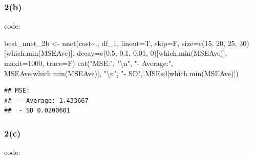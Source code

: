 \documentclass[
]{article}
\newenvironment{Shaded}{\begin{snugshade}}{\end{snugshade}}
\newcommand{\AttributeTok}[1]{\textcolor[rgb]{0.77,0.63,0.00}{#1}}
\newcommand{\DecValTok}[1]{\textcolor[rgb]{0.00,0.00,0.81}{#1}}
\newcommand{\FloatTok}[1]{\textcolor[rgb]{0.00,0.00,0.81}{#1}}
\newcommand{\FunctionTok}[1]{\textcolor[rgb]{0.00,0.00,0.00}{#1}}
\newcommand{\NormalTok}[1]{#1}
\newcommand{\OtherTok}[1]{\textcolor[rgb]{0.56,0.35,0.01}{#1}}
\newcommand{\SpecialCharTok}[1]{\textcolor[rgb]{0.00,0.00,0.00}{#1}}
\newcommand{\StringTok}[1]{\textcolor[rgb]{0.31,0.60,0.02}{#1}}
\begin{document}
\hypertarget{b-5}{%
\subsubsection{2(b)}\label{b-5}}

code:

\begin{Shaded}
\begin{Highlighting}[]
\NormalTok{best\_nnet\_2b }\OtherTok{\textless{}{-}} \FunctionTok{nnet}\NormalTok{(cost}\SpecialCharTok{\textasciitilde{}}\NormalTok{., df\_1, }\AttributeTok{linout=}\NormalTok{T, }\AttributeTok{skip=}\NormalTok{F, }
                     \AttributeTok{size=}\FunctionTok{c}\NormalTok{(}\DecValTok{15}\NormalTok{, }\DecValTok{20}\NormalTok{, }\DecValTok{25}\NormalTok{, }\DecValTok{30}\NormalTok{)[}\FunctionTok{which.min}\NormalTok{(MSEAve)], }
                     \AttributeTok{decay=}\FunctionTok{c}\NormalTok{(}\FloatTok{0.5}\NormalTok{, }\FloatTok{0.1}\NormalTok{, }\FloatTok{0.01}\NormalTok{, }\DecValTok{0}\NormalTok{)[}\FunctionTok{which.min}\NormalTok{(MSEAve)], }
                     \AttributeTok{maxit=}\DecValTok{1000}\NormalTok{, }\AttributeTok{trace=}\NormalTok{F)}
\FunctionTok{cat}\NormalTok{(}\StringTok{"MSE:"}\NormalTok{, }\StringTok{"}\SpecialCharTok{\textbackslash{}n}\StringTok{"}\NormalTok{, }\StringTok{"{-} Average:"}\NormalTok{, MSEAve[}\FunctionTok{which.min}\NormalTok{(MSEAve)], }\StringTok{"}\SpecialCharTok{\textbackslash{}n}\StringTok{"}\NormalTok{, }\StringTok{"{-} SD"}\NormalTok{, MSEsd[}\FunctionTok{which.min}\NormalTok{(MSEAve)])}
\end{Highlighting}
\end{Shaded}

\begin{verbatim}
## MSE: 
##  - Average: 1.433667 
##  - SD 0.0200601
\end{verbatim}

\hypertarget{c-5}{%
\subsubsection{2(c)}\label{c-5}}

code:
\end{document}
